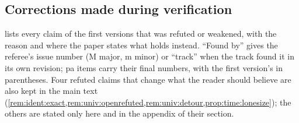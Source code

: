 \subsection{Corrections made during verification}\label{app:ver:corrections}

 lists every claim of the first versions that was refuted or weakened, with the reason and where the paper states what holds instead. ``Found by'' gives the referee's issue number (M major, m minor) or ``track'' when the track found it in its own revision; pa items carry their final numbers, with the first version's in parentheses. Four refuted claims that change what the reader should believe are also kept in the main text (\cref{rem:ident:exact,rem:univ:openrefuted,rem:univ:detour,prop:time:lonesize}); the others are stated only here and in the appendix of their section.

